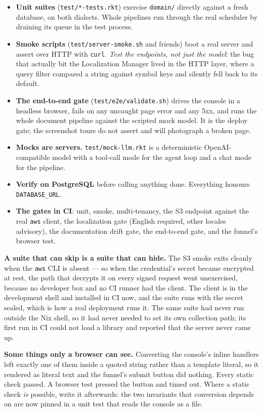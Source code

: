 \documentclass[11pt,a4paper]{report}
\begin{document}
\begin{itemize}
\item \textbf{Unit suites} (\texttt{test/*-tests.rkt}) exercise \texttt{domain/} directly against a fresh database, on both dialects. Whole pipelines run through the real scheduler by draining its queue in the test process.
\item \textbf{Smoke scripts} (\texttt{test/server-smoke.sh} and friends) boot a real server and assert over HTTP with \texttt{curl}. \emph{Test the endpoints, not just the model}: the bug that actually bit the Localization Manager lived in the HTTP layer, where a query filter compared a string against symbol keys and silently fell back to its default.
\item \textbf{The end-to-end gate} (\texttt{test/e2e/validate.sh}) drives the console in a headless browser, fails on any uncaught page error and any 5xx, and runs the whole document pipeline against the scripted mock model. It is the deploy gate; the screenshot tours do not assert and will photograph a broken page.
\item \textbf{Mocks are servers.} \texttt{test/mock-llm.rkt} is a deterministic OpenAI-compatible model with a tool-call mode for the agent loop and a chat mode for the pipeline.
\item \textbf{Verify on PostgreSQL} before calling anything done. Everything honours \texttt{DATABASE\_URL}.
\item \textbf{The gates in CI}: unit, smoke, multi-tenancy, the S3 endpoint against the real \texttt{aws} client, the localization gate (English required, other locales advisory), the documentation drift gate, the end-to-end gate, and the funnel's browser test.
\end{itemize}

\textbf{A suite that can skip is a suite that can hide.} The S3 smoke exits cleanly when the \texttt{aws} CLI is absent --- so when the credential's secret became encrypted at rest, the path that decrypts it on every signed request went unexercised, because no developer box and no CI runner had the client. The client is in the development shell and installed in CI now, and the suite runs with the secret sealed, which is how a real deployment runs it. The same suite had never run outside the Nix shell, so it had never needed to set its own collection path; its first run in CI could not load a library and reported that the server never came up.

\textbf{Some things only a browser can see.} Converting the console's inline handlers left exactly one of them inside a quoted string rather than a template literal, so it rendered as literal text and the funnel's submit button did nothing. Every static check passed. A browser test pressed the button and timed out. Where a static check \emph{is} possible, write it afterwards: the two invariants that conversion depends on are now pinned in a unit test that reads the console as a file.
\end{document}
